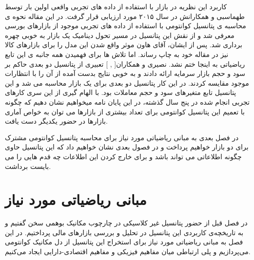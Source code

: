 \documentclass[a4paper,titlepage,12pt,fleqn,oneside]{report}
\begin{document}
	کاربرد این نظریه در بازار با استفاده از داده های تجربی واقعی اولین بار توسط طهماسبی و همکارانش\cite{tahmaseb} در سال ۲۰۱۵ مورد ارزیابی قرار گرفت. در این مقاله نحوه ی محاسبه ی پتانسیل کوانتومی با استفاده از داده های تجربی موجود از بازارهای بورسی معرفی شد و از نقش این پتانسیل در مسیر تحول دینامیک یک بازار به خوبی چهره برداری شد. پس از ایشان، آقای هاون موثر واقع شدن این مدل را برای بازارهای کالا نیز در مقاله خود به چاپ رساند\cite{shen}. اما تلاش ها برای فهمیدن همه جانبه ی این تابع ریاضیاتی به اینجا ختم نشد. نصیری و همکاران[ , ] تعبیری از پتانسیل دو بعدی حاکم بر سود و حجم بازار سرمایه ارائه دادند و به خوبی نتایج بدست آمده از آن را با انتظارات موجود مقایسه کردند. در این کار پتانسیل دو بعدی برای یک بازار محاسبه می شد و این پتانسیل تابع متغیرهای سود و حجم معاملات بود. با الهام گیری از این سری کارهای تجربی انجام شده در پنج سال گذشته، در این پایان نامه میخواهیم نشان دهیم که چگونه با تعمیم این پتانسیل کوانتومی برای تعداد بیشتری از بازارها می توان به خواص آماری بازارها در حضور یکدیگر دست یافت. 
	
	در فصل بعدی به مبانی ریاضیاتی مورد نیاز برای محاسبه پتانسیل کوانتومی مشترک برای دو بازار خواهیم پرداخت و در فصول بعدی نشان خواهیم داد که این پتانسیل حاوی چگونه اطلاعاتی می تواند باشد و برای خارج کردن این اطلاعات چه قدم هایی را می بایست برداشت. 
	
	
	
	
	\chapter{مبانی ریاضیاتی مورد نیاز}
	در فصل قبل از حضور پتانسیل غیر کلاسیکی در چارچوب مکانیک بوهمی سخن گفتیم و به تاریخچه‌ی کاربردی این پتانسیل در تحلیل و بررسی بازارهای مالی پرداختیم. در این فصل به مبانی ریاضیاتی مورد نیاز برای استخراج این پتانسیل از دل مکانیک کوانتومی می‌پردازیم و پلی ارتباطی میان مفاهیم فیزیکی و مفاهیم اقتصادی-دارایی ایجاد می‌کنیم. 
	
\end{document}
